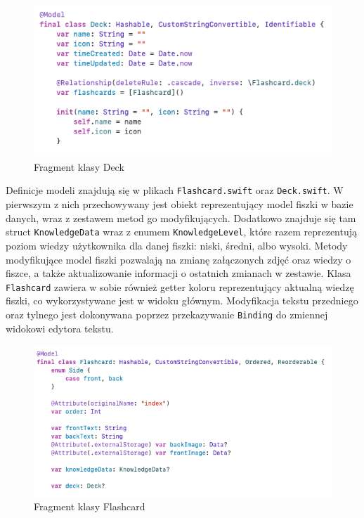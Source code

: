 \documentclass[final,a4paper,openany,12pt]{mwbk}
\begin{document}
\begin{figure}[H]
    \centering
    \includegraphics[width=0.7\linewidth]{img/swiftdata1.png}
    \caption{Fragment klasy Deck}
    \label{fig:swiftdata1}
\end{figure}

Definicje modeli znajdują się w plikach \texttt{Flashcard.swift} oraz \texttt{Deck.swift}. W pierwszym z nich przechowywany jest obiekt reprezentujący model fiszki w bazie danych, wraz z zestawem metod go modyfikujących. Dodatkowo znajduje się tam struct \texttt{KnowledgeData} wraz z enumem \texttt{KnowledgeLevel}, które razem reprezentują poziom wiedzy użytkownika dla danej fiszki: niski, średni, albo wysoki. Metody modyfikujące model fiszki pozwalają na zmianę załączonych zdjęć oraz wiedzy o fiszce, a także aktualizowanie informacji o ostatnich zmianach w zestawie. Klasa \texttt{Flashcard} zawiera w sobie również getter koloru reprezentujący aktualną wiedzę fiszki, co  wykorzystywane jest w widoku głównym. Modyfikacja tekstu przedniego oraz tylnego jest dokonywana poprzez przekazywanie \texttt{Binding} do zmiennej widokowi edytora tekstu.


\begin{figure}[H]
    \centering
    \includegraphics[width=0.7\linewidth]{img/swiftdata2.png}
    \caption{Fragment klasy Flashcard}
    \label{fig:swiftdata2}
\end{figure}
\end{document}
